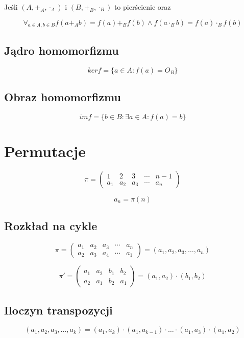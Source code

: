 \documentclass{../notatki}
\begin{document}
Jeśli $(A, +_A, \cdot_A)$ i $(B, +_B, \cdot_B)$ to pierścienie oraz

$$
\forall_{a \in A, b \in B} f(a +_A b) = f(a) +_B f(b) \wedge f(a \cdot_B b) = f(a) \cdot_B f(b)
$$

\subsection{Jądro homomorfizmu}

$$
ker f = \{a \in A: f(a) = O_B\} 
$$

\subsection{Obraz homomorfizmu}

$$
im f = \{b \in B: \exists a \in A: f(a) = b\}
$$

\section{Permutacje}

$$
\pi =
\begin{pmatrix}
  1   & 2   & 3   & \cdots & n-1   \\
  a_1 & a_2 & a_3 & \cdots &  a_n  
\end{pmatrix}
$$

$$
a_n = \pi(n)
$$

\subsection{Rozkład na cykle}

$$
\pi = 
\begin{pmatrix}
    a_1 & a_2 & a_3 & \cdots & a_n   \\
    a_2 & a_3 & a_4 & \cdots & a_1  
\end{pmatrix}
= (a_1, a_2, a_3, \dots, a_n)
$$

$$
\pi' = 
\begin{pmatrix}
    a_1 & a_2 & b_1 & b_2   \\
    a_2 & a_1 & b_2 & a_1  
\end{pmatrix}
= (a_1, a_2) \cdot (b_1, b_2)
$$

\subsection{Iloczyn transpozycji}

$$
(a_1, a_2, a_3, \dots, a_k) = (a_1, a_k) \cdot (a_1, a_{k-1}) \cdot \dots \cdot (a_1, a_3) \cdot (a_1, a_2)
$$
\end{document}
